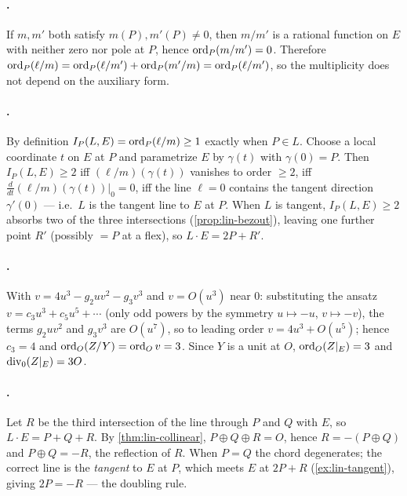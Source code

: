 \paragraph{.}
If \(m, m'\) both satisfy \(m(P), m'(P) \ne 0\), then \(m/m'\) is a rational
function on \(E\) with neither zero nor pole at \(P\), hence
\(\operatorname{ord}_P(m/m') = 0\). Therefore \(\operatorname{ord}_P(\ell/m) = \operatorname{ord}_P(\ell/m') +
\operatorname{ord}_P(m'/m) = \operatorname{ord}_P(\ell/m')\), so the multiplicity does not depend on the
auxiliary form.

\paragraph{.}
By definition \(I_P(L,E) = \operatorname{ord}_P(\ell/m)\ge 1\) exactly when \(P \in L\). Choose a
local coordinate \(t\) on \(E\) at \(P\) and parametrize \(E\) by \(\gamma(t)\) with
\(\gamma(0) = P\). Then \(I_P(L,E) \ge 2\) iff \((\ell/m)(\gamma(t))\) vanishes to
order \(\ge 2\), iff \(\frac{d}{dt}(\ell/m)(\gamma(t))|_0 = 0\), iff the line
\(\ell = 0\) contains the tangent direction \(\gamma'(0)\) --- i.e.\ \(L\) is the
tangent line to \(E\) at \(P\). When \(L\) is tangent, \(I_P(L,E) \ge 2\) absorbs
two of the three intersections (\cref{prop:lin-bezout}), leaving one further point
\(R'\) (possibly \(= P\) at a flex), so \(L \cdot E = 2P + R'\).

\paragraph{.}
With \(v = 4u^3 - g_2 u v^2 - g_3 v^3\) and \(v = O(u^3)\) near \(0\): substituting
the ansatz \(v = c_3 u^3 + c_5 u^5 + \cdots\) (only odd powers by the symmetry
\(u \mapsto -u\), \(v \mapsto -v\)), the terms \(g_2 u v^2\) and \(g_3 v^3\) are
\(O(u^7)\), so to leading order \(v = 4u^3 + O(u^5)\); hence \(c_3 = 4\) and
\(\operatorname{ord}_O(Z/Y) = \operatorname{ord}_O v = 3\). Since \(Y\) is a unit at \(O\), \(\operatorname{ord}_O(Z|_E) =
3\) and \(\operatorname{div}_0(Z|_E) = 3O\).

\paragraph{.}
Let \(R\) be the third intersection of the line through \(P\) and \(Q\) with \(E\),
so \(L \cdot E = P + Q + R\). By \cref{thm:lin-collinear},
\(P \oplus Q \oplus R = O\), hence \(R = -(P \oplus Q)\) and
\(P \oplus Q = -R\), the reflection of \(R\). When \(P = Q\) the chord degenerates;
the correct line is the \emph{tangent} to \(E\) at \(P\), which meets \(E\) at
\(2P + R\) (\cref{ex:lin-tangent}), giving \(2P = -R\) --- the doubling rule.

